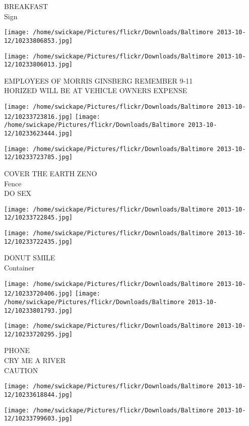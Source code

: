 \documentclass[10pt,letterpaper]{article}
\begin{document}
BREAKFAST\\
Sign
\pagebreak

\texttt{[image: /home/swickape/Pictures/flickr/Downloads/Baltimore 2013-10-12/10233806853.jpg]}

\vspace{0.25in}
\texttt{[image: /home/swickape/Pictures/flickr/Downloads/Baltimore 2013-10-12/10233806013.jpg]}

EMPLOYEES OF MORRIS GINSBERG REMEMBER 9{-}11\\
HORIZED WILL BE AT VEHICLE OWNERS EXPENSE
\pagebreak

\texttt{[image: /home/swickape/Pictures/flickr/Downloads/Baltimore 2013-10-12/10233723816.jpg]}
\texttt{[image: /home/swickape/Pictures/flickr/Downloads/Baltimore 2013-10-12/10233623444.jpg]}

\texttt{[image: /home/swickape/Pictures/flickr/Downloads/Baltimore 2013-10-12/10233723785.jpg]}

COVER THE EARTH ZENO\\
Fence\\
DO SEX
\pagebreak

\texttt{[image: /home/swickape/Pictures/flickr/Downloads/Baltimore 2013-10-12/10233722845.jpg]}

\vspace{0.25in}
\texttt{[image: /home/swickape/Pictures/flickr/Downloads/Baltimore 2013-10-12/10233722435.jpg]}

DONUT SMILE\\
Container
\pagebreak

\texttt{[image: /home/swickape/Pictures/flickr/Downloads/Baltimore 2013-10-12/10233720406.jpg]}
\texttt{[image: /home/swickape/Pictures/flickr/Downloads/Baltimore 2013-10-12/10233801793.jpg]}

\texttt{[image: /home/swickape/Pictures/flickr/Downloads/Baltimore 2013-10-12/10233720295.jpg]}

PHONE\\
CRY ME A RIVER\\
CAUTION
\pagebreak

\texttt{[image: /home/swickape/Pictures/flickr/Downloads/Baltimore 2013-10-12/10233618844.jpg]}

\vspace{0.25in}
\texttt{[image: /home/swickape/Pictures/flickr/Downloads/Baltimore 2013-10-12/10233799603.jpg]}
\end{document}
